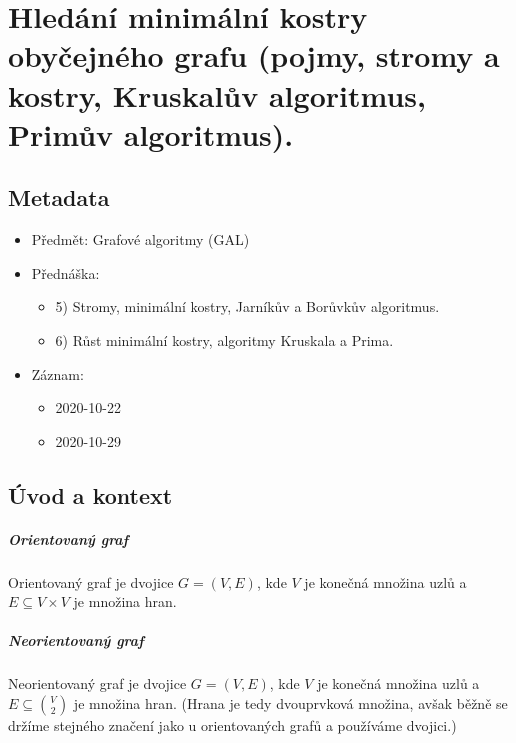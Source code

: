 

\chapter{Hledání minimální kostry obyčejného grafu (pojmy, stromy a kostry, Kruskalův algoritmus, Primův algoritmus).}

\section{Metadata}

\begin{itemize}
    \item Předmět: Grafové algoritmy (GAL)
    \item Přednáška:
    \begin{itemize}
        \item 5) Stromy, minimální kostry, Jarníkův a Borůvkův algoritmus.
        \item 6) Růst minimální kostry, algoritmy Kruskala a Prima.
    \end{itemize}
    \item Záznam:
    \begin{itemize}
        \item 2020-10-22
        \item 2020-10-29
    \end{itemize}
\end{itemize}

\section{Úvod a kontext}

\paragraph*{Orientovaný graf} Orientovaný graf je dvojice $G = (V, E)$, kde $V$ je konečná množina uzlů a $E \subseteq V \times V$ je množina hran.

\paragraph*{Neorientovaný graf} Neorientovaný graf je dvojice $G = (V, E)$, kde $V$ je konečná množina uzlů a $E \subseteq {V \choose 2}$ je množina hran. (Hrana je tedy dvouprvková množina, avšak běžně se držíme stejného značení jako u orientovaných grafů a používáme dvojici.)

